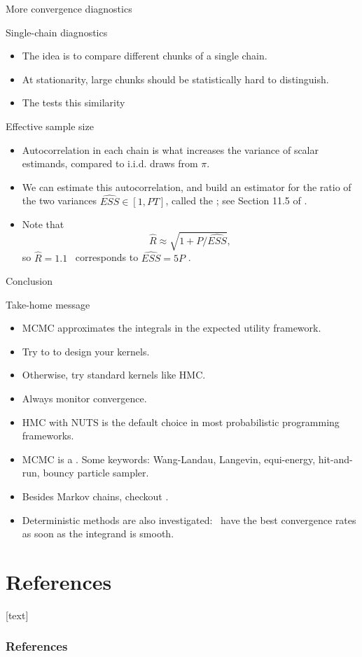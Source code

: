\documentclass[10pt]{beamer}
\let\oldcitep=\citep
\renewcommand\citep[1]{\hyperlink{#1}{\textcolor{vert}{\oldcitep{#1}}}}
\begin{document}
\begin{frame}{More convergence diagnostics}
\begin{block}{Single-chain diagnostics}
  \begin{itemize}
  \item The idea is to compare different chunks of a single chain.
  \item At stationarity, large chunks should be statistically hard to distinguish.
  \item The  tests this similarity \citep{Gew92}
  \end{itemize}
\end{block}

\begin{block}{Effective sample size}
  \begin{itemize}
  \item Autocorrelation in each chain is what increases the variance of scalar estimands, compared to i.i.d. draws from $\pi$.
  \item We can estimate this autocorrelation, and build an estimator for the ratio of the two variances $\widehat{ESS}\in [1,PT]$, called the ; see Section 11.5 of \citep{GCSDVR13}.
  \item Note that 
  $$\hat R \approx \sqrt{1+P/\widehat{ESS}},$$ so $\hat R=1.1$  corresponds to $\widehat{ESS}=5P$ \citep{VaKn21}.
  \end{itemize}
\end{block}
\end{frame}


\begin{frame}{Conclusion}
\begin{block}{Take-home message}
  \begin{itemize}
    \item MCMC approximates the integrals in the expected utility framework.
    \item Try to  to design your kernels.
    \item Otherwise, try standard kernels like HMC.
    \item Always monitor convergence.
  \end{itemize}
\end{block}

  \begin{itemize}
  \item HMC with NUTS is the default choice in most probabilistic programming frameworks.
  \item MCMC is a . Some keywords: Wang-Landau, Langevin, equi-energy, hit-and-run, bouncy particle sampler.
  \item Besides Markov chains, checkout  \citep{DeDoJa06}.
  \item Deterministic methods are also investigated:  \citep{DiPi10} have the best convergence rates as soon as the integrand is smooth.
\end{itemize}
\end{frame}


\section*{References}
[text]%
\begin{frame}[allowframebreaks]
\frametitle{References}
\small
\printbibliography
\normalsize
\end{frame}
\end{document}

